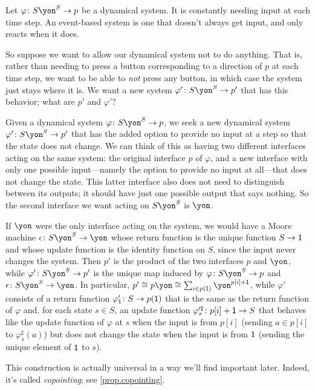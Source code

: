 \documentclass[Book-Poly]{subfiles}
\begin{document}
\begin{exercise}
Let $\varphi\colon S\yon^S\to p$ be a dynamical system. It is constantly needing input at each time step. An event-based system is one that doesn't always get input, and only reacts when it does.

So suppose we want to allow our dynamical system not to do anything. That is, rather than needing to press a button corresponding to a direction of $p$ at each time step, we want to be able to \emph{not} press any button, in which case the system just stays where it is. We want a new system $\varphi'\colon S\yon^S\to p'$ that has this behavior; what are $p'$ and $\varphi'$?
\begin{solution}
Given a dynamical system $\varphi\colon S\yon^S\to p$, we seek a new dynamical system $\varphi'\colon S\yon^S\to p'$ that has the added option to provide no input at a step so that the state does not change.
We can think of this as having two different interfaces acting on the same system: the original interface $p$ of $\varphi$, and a new interface with only one possible input---namely the option to provide no input at all---that does not change the state.
This latter interface also does not need to distinguish between its outputs; it should have just one possible output that says nothing.
So the second interface we want acting on $S\yon^S$ is $\yon$.

If $\yon$ were the only interface acting on the system, we would have a Moore machine $\epsilon\colon S\yon^S\to\yon$ whose return function is the unique function $S \to \textsf{1}$ and whose update function is the identity function on $S$, since the input never changes the system.
Then $p'$ is the product of the two interfaces $p$ and $\yon$, while $\varphi'\colon S\yon^S \to p'$ is the unique map induced by $\varphi\colon S\yon^S\to p$ and $\epsilon\colon S\yon^S\to\yon$.
In particular, $p'\iso p\yon\iso\sum_{i\in p(\1)}\yon^{p[i]+\1}$, while $\varphi'$ consists of a return function $\varphi'_{\textsf{1}}\colon S \to p(\textsf{1})$ that is the same as the return function of $\varphi$ and, for each state $s\in S$, an update function $\varphi'^\sharp_s\colon p[i]+\textsf{1}\to S$ that behaves like the update function of $\varphi$ at $s$ when the input is from $p[i]$ (sending $a\in p[i]$ to $\varphi^\sharp_s(a)$) but does not change the state when the input is from $\textsf{1}$ (sending the unique element of $\textsf{1}$ to $s$).

This construction is actually universal in a way we'll find important later. Indeed, it's called \emph{copointing}; see \cref{prop.copointing}.
\end{solution}
\end{exercise}
\end{document}
